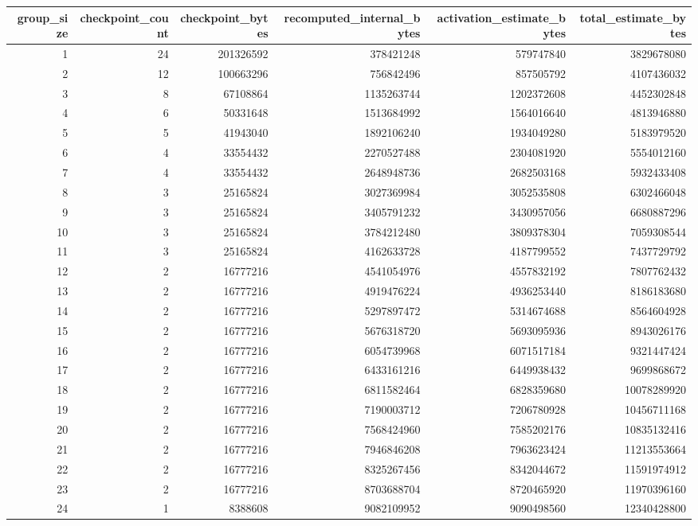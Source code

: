 \begin{tabular}{rrrrrr}
\toprule
group\_size & checkpoint\_count & checkpoint\_bytes & recomputed\_internal\_bytes & activation\_estimate\_bytes & total\_estimate\_bytes \\
\midrule
1 & 24 & 201326592 & 378421248 & 579747840 & 3829678080 \\
2 & 12 & 100663296 & 756842496 & 857505792 & 4107436032 \\
3 & 8 & 67108864 & 1135263744 & 1202372608 & 4452302848 \\
4 & 6 & 50331648 & 1513684992 & 1564016640 & 4813946880 \\
5 & 5 & 41943040 & 1892106240 & 1934049280 & 5183979520 \\
6 & 4 & 33554432 & 2270527488 & 2304081920 & 5554012160 \\
7 & 4 & 33554432 & 2648948736 & 2682503168 & 5932433408 \\
8 & 3 & 25165824 & 3027369984 & 3052535808 & 6302466048 \\
9 & 3 & 25165824 & 3405791232 & 3430957056 & 6680887296 \\
10 & 3 & 25165824 & 3784212480 & 3809378304 & 7059308544 \\
11 & 3 & 25165824 & 4162633728 & 4187799552 & 7437729792 \\
12 & 2 & 16777216 & 4541054976 & 4557832192 & 7807762432 \\
13 & 2 & 16777216 & 4919476224 & 4936253440 & 8186183680 \\
14 & 2 & 16777216 & 5297897472 & 5314674688 & 8564604928 \\
15 & 2 & 16777216 & 5676318720 & 5693095936 & 8943026176 \\
16 & 2 & 16777216 & 6054739968 & 6071517184 & 9321447424 \\
17 & 2 & 16777216 & 6433161216 & 6449938432 & 9699868672 \\
18 & 2 & 16777216 & 6811582464 & 6828359680 & 10078289920 \\
19 & 2 & 16777216 & 7190003712 & 7206780928 & 10456711168 \\
20 & 2 & 16777216 & 7568424960 & 7585202176 & 10835132416 \\
21 & 2 & 16777216 & 7946846208 & 7963623424 & 11213553664 \\
22 & 2 & 16777216 & 8325267456 & 8342044672 & 11591974912 \\
23 & 2 & 16777216 & 8703688704 & 8720465920 & 11970396160 \\
24 & 1 & 8388608 & 9082109952 & 9090498560 & 12340428800 \\
\bottomrule
\end{tabular}
